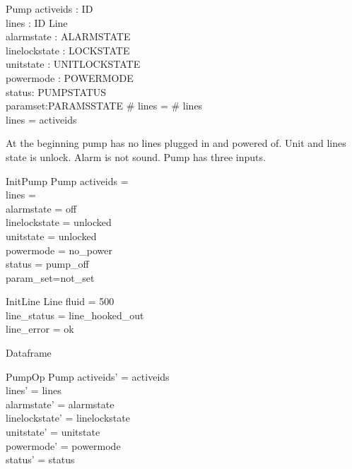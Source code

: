 \documentclass{article}
\begin{document}
	\begin{schema}{Pump}
		activeids : \power ID \\
		lines : ID \pfun Line \\
		alarmstate : ALARMSTATE \\
		linelockstate : LOCKSTATE \\
		unitstate : UNITLOCKSTATE \\
		powermode : POWERMODE \\
		status: PUMPSTATUS \\
		paramset:PARAMSSTATE
	\where
		\# \ran lines = \# \dom lines\\
		\dom lines = activeids\\
	\end{schema}
	
	At the beginning pump has no lines plugged in and powered of.
	Unit and lines state is unlock. Alarm is not sound. 
	Pump has three inputs.	
	
	\begin{schema}{InitPump}
		Pump
		\where
		activeids = \emptyset \\
		lines = \emptyset \\
		alarmstate = off \\
		linelockstate = unlocked \\
		unitstate  = unlocked \\
		powermode =  no\_power \\
		status = pump\_off\\
		param\_set=not\_set	
	\end{schema}
	
	\begin{schema}{InitLine}
		Line
		\where
		fluid = 500 \\
		line\_status = line\_hooked\_out \\
		line\_error = ok \\
	\end{schema}
	
	Dataframe
	\begin{schema}{PumpOp}
		\Delta Pump
	\where
    	activeids' = activeids \\
    	lines' = lines  \\
    	alarmstate' = alarmstate \\
    	linelockstate' = linelockstate  \\
    	unitstate' = unitstate \\
    	powermode' = powermode \\
    	status' = status \\
    \end{schema}
	
\end{document}
